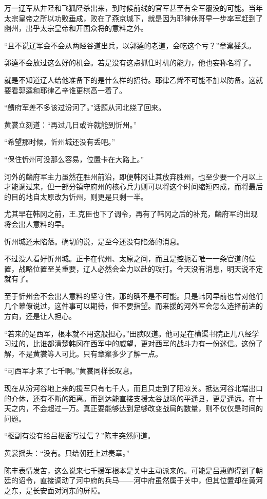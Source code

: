 万一辽军从井陉和飞狐陉杀出来，到时候前线的官军甚至有全军覆没的可能。当年太宗皇帝之所以功败垂成，败在了燕京城下，就是因为耶律休哥早一步率军赶到了幽州，出乎太宗皇帝和开国众将的意料之外。

“且不说辽军会不会从两陉谷道出兵，以郭逵的老道，会吃这个亏？”章楶摇头。

郭逵不会放过这么好的机会。若是没有这点抓住时机的能力，他也妄称名将了。

就是不知道辽人给他准备下的是什么样的招待。耶律乙烯不可能不加以防备。这就要看郭逵和耶律乙辛谁更棋高一着了。

“麟府军差不多该过汾河了。”话题从河北绕了回来。

黄裳立刻道：“再过几日或许就能到忻州。”

“希望那时候，忻州城还没有丢吧。”

“保住忻州可没那么容易，位置卡在大路上。”

河外的麟府军主力虽然在胜州前沿，即便韩冈让其放弃胜州，也至少要一个月以上才能调过来，但一部分镇守府州的核心兵力则可以将这个时间缩短四成，而将最后的目的地自太原改为忻州，则更是只剩一半。

尤其早在韩冈之前，王.克臣也下了调令，再有了韩冈之后的补充，麟府军的出现将会出人意料的早。

忻州城还未陷落。确切的说，是至今还没有陷落的消息。

不过没人看好忻州城。正卡在代州、太原之间，而且是控扼着唯一一条官道的位置，战略位置至关重要，辽人必然会全力以赴的攻打。今天没有消息，明天说不定就有了。

至于忻州会不会出人意料的坚守住，那的确不是不可能。只是韩冈早前也曾对他们几个幕僚说过，这件事可以期待，但不要指望。而来援的河外军会怎么选择前进的方向，还是让人担心。

“若来的是西军，根本就不用这般担心。”田腴叹道。他可是在横渠书院正儿八经学习过的，比谁都清楚韩冈在西军中的威望，更对西军的战斗力有一份迷信。这份了解，不是黄裳等人可比。只有章楶多少了解一点。

“可西军才来了七千啊。”黄裳同样长叹息。

现在从汾河谷地上来的援军只有七千人，而且只走到了阳凉关。抵达河谷北端出口的介休，还有不断的距离。而到达能直接支援太谷战场的平遥县，更是遥远。在十天之内，不会超过一万。真正要能够达到足够改变战局的数量，则不仅仅是时间的问题。

“枢副有没有给吕枢密写过信？”陈丰突然问道。

黄裳摇头：“没有。只给朝廷上过奏章。”

陈丰表情发苦，这么说来七千援军根本是关中主动派来的。可能是吕惠卿得到了朝廷的诏令，直接调动了河中府的兵马——河中府虽然属于关中，但其位置却在黄河之东，是长安面对河东的屏障。

